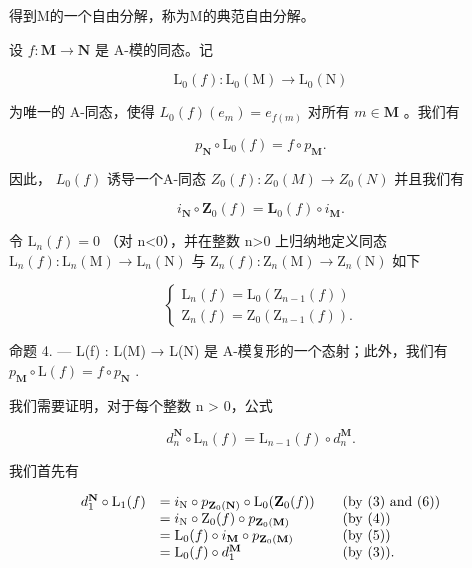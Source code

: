 得到M的一个自由分解，称为M的典范自由分解。

设 \(f: \mathbf{M} \to \mathbf{N}\) 是 A-模的同态。记

\[
\mathrm{L} _ {0} (f): \mathrm{L} _ {0} (\mathrm{M}) \rightarrow \mathrm{L} _ {0} (\mathrm{N})
\]

为唯一的 A-同态，使得 \(L_0(f)(e_m) = e_{f(m)}\) 对所有 \(m \in \mathbf{M}\) 。我们有

\[
p _ {\mathbf {N}} \circ \mathrm{L} _ {0} (f) = f \circ p _ {\mathbf {M}}.\tag{4}
\]

因此， \(L_0(f)\) 诱导一个A-同态 \(Z_0(f):Z_0(M)\to Z_0(N)\) 并且我们有

\[
i _ {\mathbf {N}} \circ \mathbf {Z} _ {0} (f) = \mathbf {L} _ {0} (f) \circ i _ {\mathbf {M}}.\tag{5}
\]

令 \(\mathrm{L}_{n}(f)=0\) （对 n\textless0），并在整数 n\textgreater0 上归纳地定义同态 \(\mathrm{L}_{n}(f):\mathrm{L}_{n}(\mathrm{M})\to\mathrm{L}_{n}(\mathrm{N})\) 与 \(\mathrm{Z}_{n}(f):\mathrm{Z}_{n}(\mathrm{M})\to\mathrm{Z}_{n}(\mathrm{N})\) 如下

\[
\left\{ \begin{array}{l} \mathrm{L} _ {n} (f) = \mathrm{L} _ {0} (\mathrm{Z} _ {n - 1} (f)) \\ \mathrm{Z} _ {n} (f) = \mathrm{Z} _ {0} (\mathrm{Z} _ {n - 1} (f)). \end{array} \right.\tag{6}
\]

命题 4. --- L(f) : L(M) → L(N) 是 A-模复形的一个态射；此外，我们有 \(p_{\mathbf{M}} \circ \mathrm{L}(f) = f \circ p_{\mathbf{N}}\) .

我们需要证明，对于每个整数 n \textgreater{} 0，公式

\[
d _ {n} ^ {\mathbf {N}} \circ \mathrm{L} _ {n} (f) = \mathrm{L} _ {n - 1} (f) \circ d _ {n} ^ {\mathbf {M}}.
\]

我们首先有

\[
\begin{array}{r l r l} d _ {1} ^ {\mathbf {N}} \circ \mathrm{L} _ {1} (f) & = i _ {\mathrm{N}} \circ p _ {\mathbf {Z} _ {0} (\mathbf {N})} \circ \mathrm{L} _ {0} (\mathbf {Z} _ {0} (f)) & & (\mathrm {by~(3)~and~(6)}) \\ & = i _ {\mathrm{N}} \circ \mathrm{Z} _ {0} (f) \circ p _ {\mathbf {Z} _ {0} (\mathbf {M})} & & (\mathrm {by~(4)}) \\ & = \mathrm{L} _ {0} (f) \circ i _ {\mathbf {M}} \circ p _ {\mathbf {Z} _ {0} (\mathbf {M})} & & (\mathrm {by~(5)}) \\ & = \mathrm{L} _ {0} (f) \circ d _ {1} ^ {\mathbf {M}} & & (\mathrm {by~(3))}. \end{array}
\]

